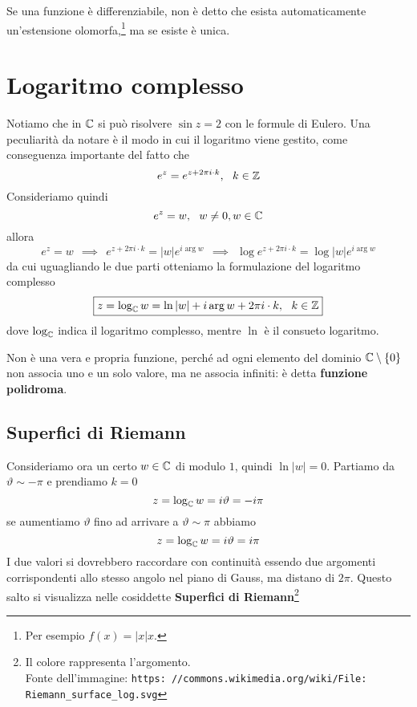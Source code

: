 \begin{thm}
Se una funzione è differenziabile, non è detto che esista automaticamente un'estensione olomorfa,\footnote{Per esempio $f(x) = | x| x$.} ma se esiste è unica.
\end{thm}

\section{Logaritmo complesso}

Notiamo che in $\mathbb{C}$ si può risolvere $\sin z = 2$ con le formule di Eulero. Una peculiarità da notare è il modo in cui il logaritmo viene gestito, come conseguenza importante del fatto che
\begin{equation*}
e^{z} = e^{z + 2\pi i\cdot k}, \ \ k\in \mathbb{Z}
\end{equation*}
Consideriamo quindi
\begin{equation*}
e^{z} = w, \ \ w\neq 0, w\in \mathbb{C}
\end{equation*}
allora
\begin{equation*}
e^{z} = w\ \ \implies \ \ e^{z + 2\pi i\cdot k} = | w| e^{i\arg w} \ \ \implies \ \ \log e^{z + 2\pi i\cdot k} = \log| w| e^{i\arg w}
\end{equation*}
da cui uguagliando le due parti otteniamo la formulazione del logaritmo complesso
\begin{equation*}
\boxed{z = \log_{\mathbb{C}} w = \ln| w| + i\arg w + 2\pi i\cdot k, \ \ k\in \mathbb{Z}}
\end{equation*}
dove $\log_{\mathbb{C}}$ indica il logaritmo complesso, mentre $\ln$ è il consueto logaritmo.

Non è una vera e propria funzione, perché ad ogni elemento del dominio $\mathbb{C} \setminus \{0\}$ non associa uno e un solo valore, ma ne associa infiniti: è detta \textbf{funzione polidroma}.

\subsection{Superfici di Riemann}

Consideriamo ora un certo $w\in \mathbb{C}$ di modulo $1$, quindi $\ln| w| = 0$. Partiamo da $\vartheta \sim - \pi $ e prendiamo $k = 0$
\begin{equation*}
z = \log_{\mathbb{C}} w = i\vartheta = - i\pi
\end{equation*}
se aumentiamo $\vartheta $ fino ad arrivare a $\vartheta \sim \pi $ abbiamo
\begin{equation*}
z = \log_{\mathbb{C}} w = i\vartheta = i\pi
\end{equation*}
I due valori si dovrebbero raccordare con continuità essendo due argomenti corrispondenti allo stesso angolo nel piano di Gauss, ma distano di $2\pi $. Questo salto si visualizza nelle cosiddette \textbf{Superfici di Riemann}\footnote{Il colore rappresenta l'argomento.\\Fonte dell'immagine: \texttt{https: //commons.wikimedia.org/wiki/File: Riemann\_surface\_log.svg}}

